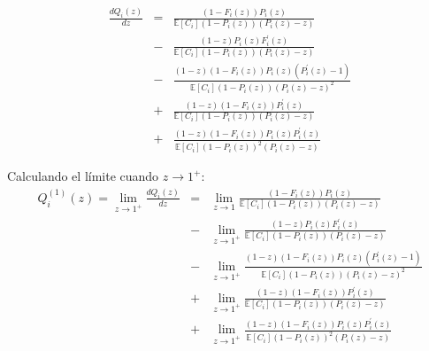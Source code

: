 \documentclass{article}
\newcommand{\esp}{\mathbb{E}}
\begin{document}
\begin{eqnarray*}
\frac{d Q_{i}\left(z\right)}{d z}&=&\frac{\left(1-F_{i}\left(z\right)\right)P_{i}\left(z\right)}{\esp\left[C_{i}\right]\left(1-P_{i}\left(z\right)\right)\left(P_{i}\left(z\right)-z\right)}\\
&-&\frac{\left(1-z\right)P_{i}\left(z\right)F_{i}^{'}\left(z\right)}{\esp\left[C_{i}\right]\left(1-P_{i}\left(z\right)\right)\left(P_{i}\left(z\right)-z\right)}\\
&-&\frac{\left(1-z\right)\left(1-F_{i}\left(z\right)\right)P_{i}\left(z\right)\left(P_{i}^{'}\left(z\right)-1\right)}{\esp\left[C_{i}\right]\left(1-P_{i}\left(z\right)\right)\left(P_{i}\left(z\right)-z\right)^{2}}\\
&+&\frac{\left(1-z\right)\left(1-F_{i}\left(z\right)\right)P_{i}^{'}\left(z\right)}{\esp\left[C_{i}\right]\left(1-P_{i}\left(z\right)\right)\left(P_{i}\left(z\right)-z\right)}\\
&+&\frac{\left(1-z\right)\left(1-F_{i}\left(z\right)\right)P_{i}\left(z\right)P_{i}^{'}\left(z\right)}{\esp\left[C_{i}\right]\left(1-P_{i}\left(z\right)\right)^{2}\left(P_{i}\left(z\right)-z\right)}
\end{eqnarray*}

Calculando el l\'imite cuando $z\rightarrow1^{+}$:
\begin{eqnarray}
Q_{i}^{(1)}\left(z\right)=\lim_{z\rightarrow1^{+}}\frac{d Q_{i}\left(z\right)}{dz}&=&\lim_{z\rightarrow1}\frac{\left(1-F_{i}\left(z\right)\right)P_{i}\left(z\right)}{\esp\left[C_{i}\right]\left(1-P_{i}\left(z\right)\right)\left(P_{i}\left(z\right)-z\right)}\\
&-&\lim_{z\rightarrow1^{+}}\frac{\left(1-z\right)P_{i}\left(z\right)F_{i}^{'}\left(z\right)}{\esp\left[C_{i}\right]\left(1-P_{i}\left(z\right)\right)\left(P_{i}\left(z\right)-z\right)}\\
&-&\lim_{z\rightarrow1^{+}}\frac{\left(1-z\right)\left(1-F_{i}\left(z\right)\right)P_{i}\left(z\right)\left(P_{i}^{'}\left(z\right)-1\right)}{\esp\left[C_{i}\right]\left(1-P_{i}\left(z\right)\right)\left(P_{i}\left(z\right)-z\right)^{2}}\\
&+&\lim_{z\rightarrow1^{+}}\frac{\left(1-z\right)\left(1-F_{i}\left(z\right)\right)P_{i}^{'}\left(z\right)}{\esp\left[C_{i}\right]\left(1-P_{i}\left(z\right)\right)\left(P_{i}\left(z\right)-z\right)}\\
&+&\lim_{z\rightarrow1^{+}}\frac{\left(1-z\right)\left(1-F_{i}\left(z\right)\right)P_{i}\left(z\right)P_{i}^{'}\left(z\right)}{\esp\left[C_{i}\right]\left(1-P_{i}\left(z\right)\right)^{2}\left(P_{i}\left(z\right)-z\right)}
\end{eqnarray}
\end{document}
